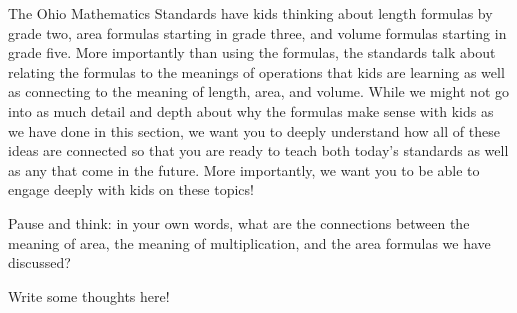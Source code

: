 \documentclass{ximera}
\begin{document}
The Ohio Mathematics Standards have kids thinking about length formulas by grade two, area formulas starting in grade three, and volume formulas starting in grade five. More importantly than using the formulas, the standards talk about relating the formulas to the meanings of operations that kids are learning as well as connecting to the meaning of length, area, and volume. While we might not go into as much detail and depth about why the formulas make sense with kids as we have done in this section, we want you to deeply understand how all of these ideas are connected so that you are ready to teach both today's standards as well as any that come in the future. More importantly, we want you to be able to engage deeply with kids on these topics!

\begin{question}
Pause and think: in your own words, what are the connections between the meaning of area, the meaning of multiplication, and the area formulas we have discussed?
\begin{freeResponse}
Write some thoughts here!
\end{freeResponse}
\end{question}
\end{document}
